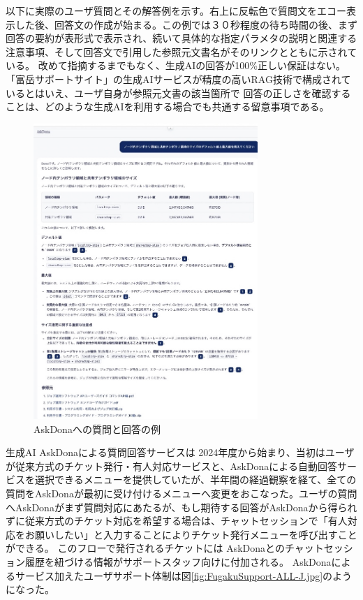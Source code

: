 \documentclass{jsaxiesproc}
\begin{document}
以下に実際のユーザ質問とその解答例を示す。右上に反転色で質問文をエコー表示した後、回答文の作成が始まる。この例では３０秒程度の待ち時間の後、まず回答の要約が表形式で表示され、続いて具体的な指定パラメタの説明と関連する注意事項、そして回答文で引用した参照元文書名がそのリンクとともに示されている。
改めて指摘するまでもなく、生成AIの回答が100\%正しい保証はない。
「富岳サポートサイト」の生成AIサービスが精度の高いRAG技術で構成されているとはいえ、ユーザ自身が参照元文書の該当箇所で
回答の正しさを確認することは、どのような生成AIを利用する場合でも共通する留意事項である。


\begin{figure}[htbp]
\includegraphics[width=8.5cm]{figs/AskDona-Answer.jpg}
\caption{AskDonaへの質問と回答の例}
\label{fig:AskDona-Answer.jpg}
\end{figure}

生成AI AskDonaによる質問回答サービスは 2024年度から始まり、当初はユーザが従来方式のチケット発行・有人対応サービスと、AskDonaによる自動回答サービスを選択できるメニューを提供していたが、半年間の経過観察を経て、全ての質問をAskDonaが最初に受け付けるメニューへ変更をおこなった。ユーザの質問へAskDonaがまず質問対応にあたるが、もし期待する回答がAskDonaから得られずに従来方式のチケット対応を希望する場合は、チャットセッションで「有人対応をお願いしたい」と入力することによりチケット発行メニューを呼び出すことができる。
このフローで発行されるチケットには AskDonaとのチャットセッション履歴を紐づける情報がサポートスタッフ向けに付加される。
AskDonaによるサービス加えたユーザサポート体制は図\ref{fig:FugakuSupport-ALL-J.jpg}のようになった。
\end{document}
